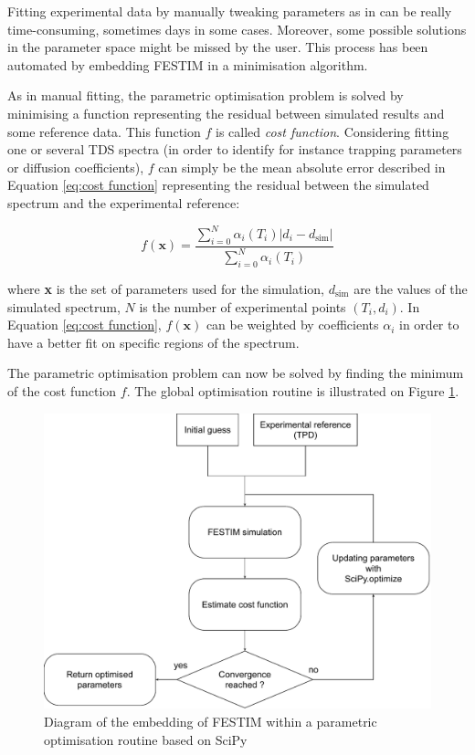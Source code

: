 Fitting experimental data by manually tweaking parameters as in  can be really time-consuming, sometimes days in some cases.
Moreover, some possible solutions in the parameter space might be missed by the user.
This process has been automated by embedding FESTIM in a minimisation algorithm.

As in manual fitting, the parametric optimisation problem is solved by minimising a function representing the residual between simulated results and some reference data.
This function $f$ is called \textit{cost function}.
Considering fitting one or several TDS spectra (in order to identify for instance trapping parameters or diffusion coefficients), $f$ can simply be the mean absolute error described in Equation \ref{eq:cost function} representing the residual between the simulated spectrum and the experimental reference: 

\begin{equation}
    f(\textbf{x})=\frac{\sum_{i=0}^{N}  \alpha_i(T_i)\left| d_{i}-d_{\mathrm{sim}}\right|}{\sum_{i=0}^{N}  \alpha_i(T_i)}
    \label{eq:cost function}
\end{equation}

where \textbf{x} is the set of parameters used for the simulation, $d_\mathrm{sim}$ are the values of the simulated spectrum, $N$ is the number of experimental points $(T_i, d_i)$.
In Equation \ref{eq:cost function}, $f(\textbf{x})$ can be weighted by coefficients $\alpha_i$ in order to have a better fit on specific regions of the spectrum.

The parametric optimisation problem can now be solved by finding the minimum of the cost function $f$.
The global optimisation routine is illustrated on Figure \ref{fig:diagramm}.
\begin{figure}
    \centering
    \includegraphics[width=\linewidth]{Figures/Chapter3/Parametric_optimisation/algorithm diagram.pdf}
    \caption{Diagram of the embedding of FESTIM within a parametric optimisation routine based on SciPy \cite{virtanen_scipy_2020}}
    \label{fig:diagramm}
\end{figure}

